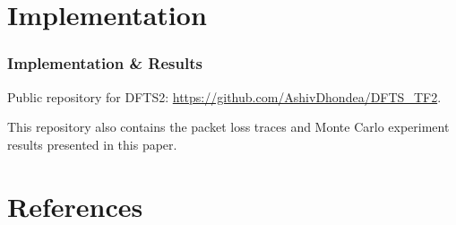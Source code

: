 \documentclass[aspectratio=169]{beamer}
\begin{document}
\section{Implementation}
\begin{frame}
\frametitle{Implementation \& Results}
Public repository for DFTS2: \url{https://github.com/AshivDhondea/DFTS_TF2}.

This repository also contains the packet loss traces and Monte Carlo experiment results presented in this paper.
	\end{frame}
	
\section{References}


\end{document}
